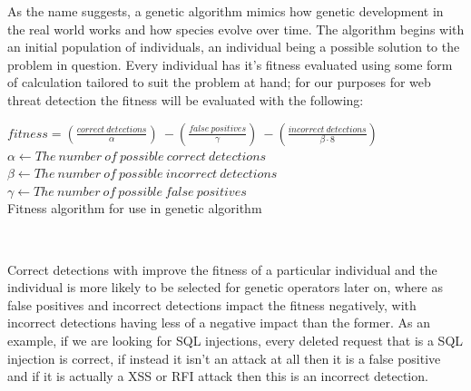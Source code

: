 As the name suggests, a genetic algorithm mimics how genetic development in the real world works and how species evolve over time.  The algorithm begins with an initial population of individuals, an individual being a possible solution to the problem in question.  Every individual has it's fitness evaluated using some form of calculation tailored to suit the problem at hand; for our purposes for web threat detection the fitness will be evaluated with the following:

\begin{algorithm}[H]
	\centering

	$fitness = (\frac{correct\ detections}{\alpha})\ - (\frac{false\ positives}{\gamma})\ - (\frac{incorrect\ detections}{\beta \cdot 8})$ \\
	
	$\alpha \leftarrow The\ number\ of\ possible\ correct\ detections$ \\
	$\beta \leftarrow The\ number\ of\ possible\ incorrect\ detections$ \\
	$\gamma \leftarrow The\ number\ of\ possible\ false\ positives$ \\
	
	\caption{Fitness algorithm for use in genetic algorithm}
	\label{alg:fitness}
	\\
\end{algorithm}

Correct detections with improve the fitness of a particular individual and the individual is more likely to be selected for genetic operators later on, where as false positives and incorrect detections impact the fitness negatively, with incorrect detections having less of a negative impact than the former.  As an example, if we are looking for SQL injections, every deleted request that is a SQL injection is correct, if instead it isn't an attack at all then it is a false positive and if it is actually a XSS or RFI attack then this is an incorrect detection.

